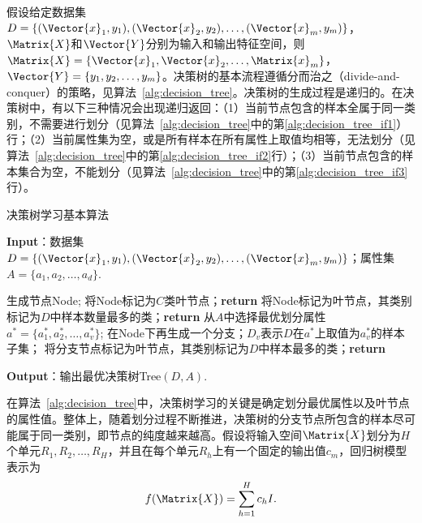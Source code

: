 假设给定数据集$D=\{(\Vector{x}_1,y_1),(\Vector{x}_2,y_2),\ldots,(\Vector{x}_m,y_m)\}$，$\Matrix{X}$和$\Vector{Y}$分别为输入和输出特征空间，则$\Matrix{X}=\{\Vector{x}_1,\Vector{x}_2,\ldots,\Matrix{x}_m\}$，$\Vector{Y}=\{y_1,y_2,\ldots,y_m\}$。决策树的基本流程遵循分而治之（divide-and-conquer）的策略，见算法~\ref{alg:decision_tree}。决策树的生成过程是递归的。在决策树中，有以下三种情况会出现递归返回：（1）当前节点包含的样本全属于同一类别，不需要进行划分（见算法~\ref{alg:decision_tree}中的第\ref{alg:decision_tree_if1}）行；（2）当前属性集为空，或是所有样本在所有属性上取值均相等，无法划分（见算法~\ref{alg:decision_tree}中的第\ref{alg:decision_tree_if2}行）；（3）当前节点包含的样本集合为空，不能划分（见算法~\ref{alg:decision_tree}中的第\ref{alg:decision_tree_if3}行）。
\begin{algorithm}[!htbp]
  \small
  \caption{决策树学习基本算法}\label{alg:decision_tree}
  \textbf{Input}：{数据集$D=\{(\Vector{x}_1,y_1),(\Vector{x}_2,y_2),\ldots,(\Vector{x}_m,y_m)\}$；属性集$A=\{a_1,a_2,\ldots,a_d\}$.}
  \begin{algorithmic}[1]
    \State 生成节点Node;
    \State 将Node标记为$C$类叶节点；\textbf{return}\label{alg:decision_tree_if1}
    \EndIf
    \State 将Node标记为叶节点，其类别标记为$D$中样本数量最多的类；\textbf{return}\label{alg:decision_tree_if2}
    \EndIf
    \State 从$A$中选择最优划分属性$a^*=\{a_1^*,a_2^*,\ldots,a_v^*\}$;
      \State 在Node下再生成一个分支；$D_v$表示$D$在$a^*$上取值为$a_v^*$的样本子集；
      \State 将分支节点标记为叶节点，其类别标记为$D$中样本最多的类；\textbf{return} \label{alg:decision_tree_if3}
      \EndIf 
    \EndFor
    \EndProcedure
  \end{algorithmic}
  \textbf{Output}：{输出最优决策树Tree$(D,A)$.}
\end{algorithm}

在算法~\ref{alg:decision_tree}中，决策树学习的关键是确定划分最优属性以及叶节点的属性值。整体上，随着划分过程不断推进，决策树的分支节点所包含的样本尽可能属于同一类别，即节点的纯度越来越高。假设将输入空间$\Matrix{X}$划分为$H$个单元$R_1,R_2,\ldots,R_H$，并且在每个单元$R_h$上有一个固定的输出值$c_m$，回归树模型表示为
\begin{equation}
  \label{eq:decision_tree}
  f(\Matrix{X})=\sum_{h=1}^{H}c_hI.
\end{equation}

